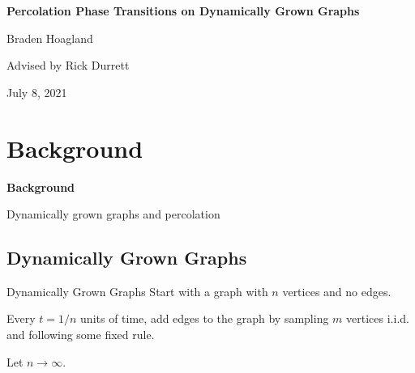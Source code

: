 \documentclass{beamer}
\begin{document}
{
\begin{frame}
	\bfseries
	{\color{white}
		\huge Percolation Phase Transitions on Dynamically Grown Graphs
	}
	\vspace{5mm}

	{\color{myblue}
		\large Braden Hoagland

		Advised by Rick Durrett
	}

	\vspace*{\fill}
	{\color{white}
		\small July 8, 2021
	}
\end{frame}
}

\begin{frame}
	\tableofcontents
\end{frame}

\section{Background}

{
\begin{frame}
        \bfseries
        {\color{white}
                \huge Background
        }
        \vspace{5mm}

	{\color{myblue}
		Dynamically grown graphs and percolation
	}
\end{frame}
}

\subsection{Dynamically Grown Graphs}

\begin{frame}{Dynamically Grown Graphs}
	Start with a graph with $n$ vertices and no edges.
	\vspace{5mm}

	Every $t=1/n$ units of time, add edges to the graph by sampling $m$ vertices i.i.d. and following some fixed rule.
	\vspace{5mm}

	\pause
	Let $n\to \infty$.
\end{frame}
\end{document}
